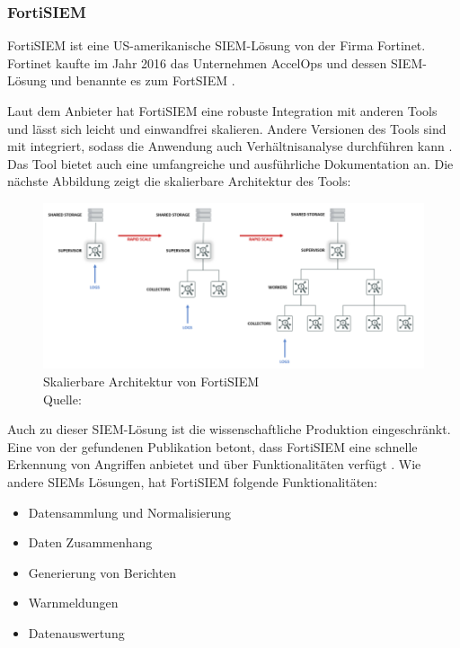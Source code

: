 \subsubsection{FortiSIEM}
FortiSIEM ist eine US-amerikanische \gls{SIEM}-Lösung von der Firma Fortinet. Fortinet kaufte im Jahr 2016 das Unternehmen AccelOps und dessen \gls{SIEM}-Lösung und benannte es zum FortSIEM \citep{Fortinet_Press}. 

Laut dem Anbieter hat FortiSIEM eine robuste Integration mit anderen Tools und lässt sich leicht und einwandfrei skalieren. Andere Versionen des Tools sind mit  integriert, sodass die Anwendung auch Verhältnisanalyse durchführen kann \citep{Fortinet_Solutions}. Das Tool bietet auch eine umfangreiche und ausführliche Dokumentation an. Die nächste Abbildung zeigt die skalierbare Architektur des Tools:

\begin{figure}[H]
   \centering
   \includegraphics[width=1\textwidth]{assets/2_p7.png}
   \caption[Skalierbare Architektur von FortiSIEM]
   {Skalierbare Architektur von FortiSIEM \\Quelle: \citep{Fortinet_Arch} }
   \centering
\end{figure}

\newpage
Auch zu dieser \gls{SIEM}-Lösung ist die wissenschaftliche Produktion eingeschränkt. Eine von der gefundenen Publikation betont, dass FortiSIEM eine schnelle Erkennung von Angriffen anbietet und über   Funktionalitäten verfügt \citep{Ramires_fortisiem}. Wie andere \glspl{SIEM} Lösungen, hat FortiSIEM folgende Funktionalitäten:

\begin{itemize}[noitemsep]
   \item Datensammlung und Normalisierung
   \item Daten Zusammenhang
   \item Generierung von Berichten
   \item Warnmeldungen
   \item Datenauswertung
\end{itemize}

